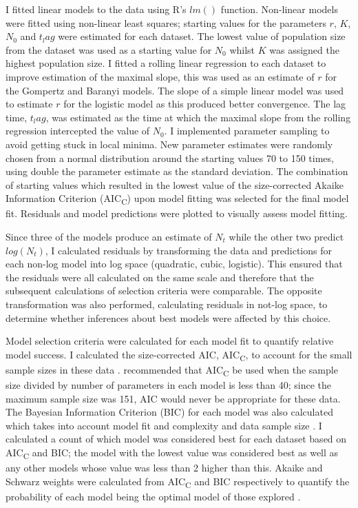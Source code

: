\documentclass[11pt]{article}
\begin{document}
\begin{linenumbers}
            I fitted linear models to the data using R's $lm()$ function. Non-linear models were fitted using non-linear least squares; starting values for the parameters $r$, $K$, $N_0$ and $t_lag$ were estimated for each dataset. The lowest value of population size from the dataset was used as a starting value for $N_0$ whilst $K$ was assigned the highest population size. I fitted a rolling linear regression to each dataset to improve estimation of the maximal slope, this was used as an estimate of $r$ for the Gompertz and Baranyi models. The slope of a simple linear model was used to estimate $r$ for the logistic model as this produced better convergence. The lag time, $t_lag$, was estimated as the time at which the maximal slope from the rolling regression intercepted the value of $N_0$. I implemented parameter sampling to avoid getting stuck in local minima. New parameter estimates were randomly chosen from a normal distribution around the starting values 70 to 150 times, using double the parameter estimate as the standard deviation. The combination of starting values which resulted in the lowest value of the size-corrected Akaike Information Criterion (AIC\textsubscript{C}) upon model fitting was selected for the final model fit. Residuals and model predictions were plotted to visually assess model fitting. 
            
            Since three of the models produce an estimate of $N_t$ while the other two predict $log(N_t)$, I calculated residuals by transforming the data and predictions for each non-log model into log space (quadratic, cubic, logistic). This ensured that the residuals were all calculated on the same scale and therefore that the subsequent calculations of selection criteria were comparable. The opposite transformation was also performed, calculating residuals in not-log space, to determine whether inferences about best models were affected by this choice.
            
            Model selection criteria were calculated for each model fit to quantify relative model success. I calculated the size-corrected AIC, AIC\textsubscript{C}, to account for the small sample sizes in these data \citep{yang_4_2019}. \citet[p.~445]{burnham_model_2002} recommended that AIC\textsubscript{C} be used when the sample size divided by number of parameters in each model is less than 40; since the maximum sample size was 151, AIC would never be appropriate for these data. The Bayesian Information Criterion (BIC) for each model was also calculated which takes into account model fit and complexity and data sample size \citep{johnson_model_2004}. I calculated a count of which model was considered best for each dataset based on AIC\textsubscript{C} and BIC; the model with the lowest value was considered best as well as any other models whose value was less than 2 higher than this. Akaike and Schwarz weights were calculated from AIC\textsubscript{C} and BIC respectively to quantify the probability of each model being the optimal model of those explored \citep{wagenmakers_aic_2004}.



\end{linenumbers}
\end{document}
